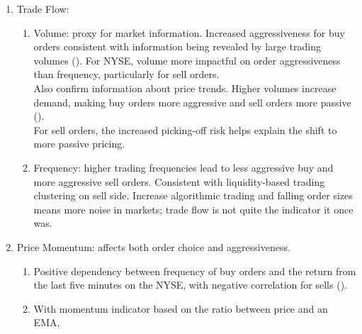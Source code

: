 \begin{remark}
\begin{enumerate}[label=\roman*.]
\begin{enumerate}[label=\arabic*.]
\begin{enumerate}[label=\alph*.]
\setlength{\itemsep}{0pt}
\item Depth: amount available for trading. Much of available liquidity lies outside best bid/offer.\\
Hidden orders on Euronext priced more aggressively if there was sufficient depth already available on same side. Displayed depth on opposite side had limited effect on hidden order placement.
\item Imbalance: difference between quantities available to buy and sell
\item Height: maximum potential price impact for a market order walking up the order book
\end{enumerate}
For same side of order book, aggressiveness increases with height, for opposite side it decreases.
\item Trade Flow:
\begin{enumerate}[label=\alph*.]
\setlength{\itemsep}{0pt}
\item Volume: proxy for market information. Increased aggressiveness for buy orders consistent with information being revealed by large trading volumes (\cite{easley_ohara_1987}). For NYSE, volume more impactful on order aggressiveness than frequency, particularly for sell orders.\\
Also confirm information about price trends. Higher volumes increase demand, making buy orders more aggressive and sell orders more passive (\cite{beber_caglio_2005}).\\
For sell orders, the increased picking-off risk helps explain the shift to more passive pricing.
\item Frequency: higher trading frequencies lead to less aggressive buy and more aggressive sell orders. Consistent with liquidity-based trading clustering on sell side. Increase algorithmic trading and falling order sizes means more noise in markets; trade flow is not quite the indicator it once was.
\end{enumerate}
\item Price Momentum: affects both order choice and aggressiveness.
\begin{enumerate}[label=\alph*.]
\setlength{\itemsep}{0pt}
\item Positive dependency between frequency of buy orders and the return from the last five minutes on the NYSE, with negative correlation for sells (\cite{ellul_et_al_2003}).
\item With momentum indicator based on the ratio between price and an EMA,

\end{enumerate}
\end{enumerate}
\end{enumerate}
\end{remark}
